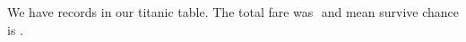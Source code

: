 \documentclass[preview, convert]{standalone}
\begin{document}
%

%




We have  records in our titanic table. The total fare was $$  and mean survive chance is .


\end{document}
